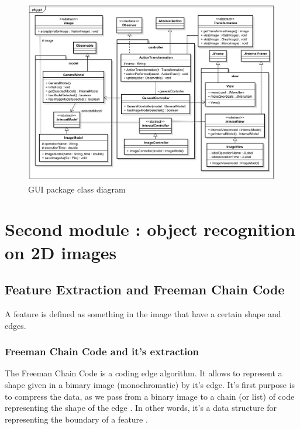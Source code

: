 \begin{figure}[ht]
	\centering
	\includegraphics[width=1\textwidth]{images/diagrams/class_diagram_gui}
	\caption{GUI package class diagram}
	\label{fig:diagram:class:gui}
\end{figure}







\section{Second module : object recognition on 2D images}



\subsection{Feature Extraction and Freeman Chain Code}


A feature is defined as something in the image that have a certain shape and edges. 






\subsubsection{Freeman Chain Code and it's extraction}


The Freeman Chain Code is a coding edge algorithm. It allows to represent a shape given in a bimary image (monochromatic) by it's edge. It's first purpose is to compress the data, as we pass from a binary image to a chain (or list) of code representing the shape of the edge \cite{bib:chain:ParametreGeometriqueChaineFreeman}. In other words, it's a data structure for representing the boundary of a feature \cite{bib:chain:DigitalImageProcessing}.

